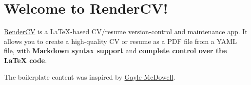 \section{Welcome to RenderCV!}
\begin{onecolentry}
    \href{https://rendercv.com}{RenderCV} is a LaTeX-based CV/resume version-control and maintenance app. It allows you to create a high-quality CV or resume as a PDF file from a YAML file, with \textbf{Markdown syntax support} and \textbf{complete control over the LaTeX code}.
\end{onecolentry}

\vspace{0.2 cm}

\begin{onecolentry}
    The boilerplate content was inspired by \href{https://github.com/dnl-blkv/mcdowell-cv}{Gayle McDowell}.
\end{onecolentry}